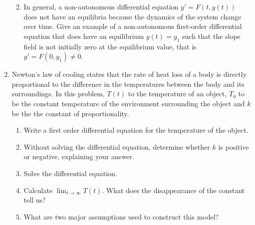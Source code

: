 \documentclass[10pt,psamsfonts,reqno,oneside,letterpaper]{amsart}
\begin{document}
\begin{enumerate}
\begin{enumerate}
\begin{enumerate}
	\end{enumerate}
	
	\item In general, a non-autonomous differential equation $y'=F(t,y(t))$ does not have an equilibria because the dynamics of the system change over time. Give an example of a non-autonomous first-order differential equation that does have an equilibrium $y(t)=y_1$ such that the slope field is not initially zero at the equilibrium value, that is $y'=F(0,y_1)\neq 0$.

\end{enumerate}
	
	\item  Newton's law of cooling states that the rate of heat loss of a body is directly proportional to the difference in the temperatures between the body and its surroundings. In this problem, $T(t)$ to the temperature of an object, $T_0$ to be the constant temperature of the environment surrounding the object and $k$ be the the constant of proportionality.
	
	\begin{enumerate}
		\item Write a first order differential equation for the temperature of the object.
		
	\item Without solving the differential equation, determine whether $k$ is positive or negative, explaining your answer.
		
	\item  Solve the differential equation.
		
		\item Calculate $\displaystyle \lim_{t\rightarrow \infty} T(t)$. What does the disappearance of the constant tell us?

		
		\item What are two major assumptions used to construct this model?
\end{enumerate}
	

\end{enumerate}
\end{document}
